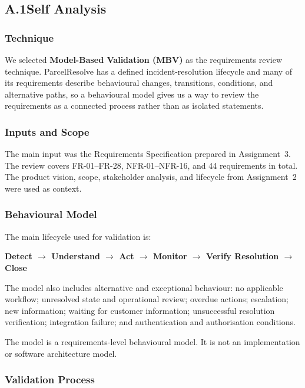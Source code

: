 \documentclass[11pt,a4paper]{article}
\begin{document}
\subsection*{A.1\enspace Self Analysis}

\subsubsection*{Technique}

We selected \textbf{Model-Based Validation (MBV)} as the requirements review technique. ParcelResolve has a defined incident-resolution lifecycle and many of its requirements describe behavioural changes, transitions, conditions, and alternative paths, so a behavioural model gives us a way to review the requirements as a connected process rather than as isolated statements.

\subsubsection*{Inputs and Scope}

The main input was the Requirements Specification prepared in Assignment~3. The review covers FR-01–FR-28, NFR-01–NFR-16, and 44 requirements in total. The product vision, scope, stakeholder analysis, and lifecycle from Assignment~2 were used as context.

\subsubsection*{Behavioural Model}

The main lifecycle used for validation is:

\begin{center}
\textbf{Detect $\rightarrow$ Understand $\rightarrow$ Act $\rightarrow$ Monitor $\rightarrow$ Verify Resolution $\rightarrow$ Close}
\end{center}

The model also includes alternative and exceptional behaviour: no applicable workflow; unresolved state and operational review; overdue actions; escalation; new information; waiting for customer information; unsuccessful resolution verification; integration failure; and authentication and authorisation conditions.

The model is a requirements-level behavioural model. It is not an implementation or software architecture model.

\subsubsection*{Validation Process}
\end{document}

